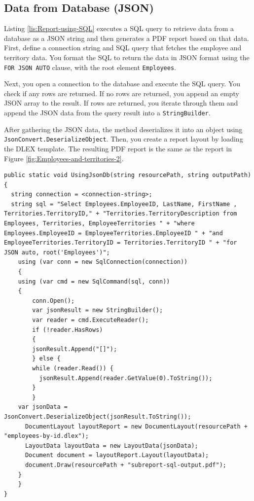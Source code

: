 \documentclass[american,letterpaper]{tufte-book}
\numberwithin{equation}{section}
\numberwithin{figure}{section}
\begin{document}
{{\subsection{Data from Database (JSON)}

Listing \ref{lis:Report-using-SQL} executes a SQL query to retrieve
data from a database as a JSON string and then generates a PDF report
based on that data. First, define a connection string and SQL query
that fetches the employee and territory data. You format the SQL to
return the data in JSON format using the \texttt{FOR JSON AUTO} clause,
with the root element \texttt{Employees}.

Next, you open a connection to the database and execute the SQL query.
You check if any rows are returned. If no rows are returned, you append
an empty JSON array to the result. If rows are returned, you iterate
through them and append the JSON data from the query result into a
\texttt{StringBuilder}.

After gathering the JSON data, the method deserializes it into an
object using \texttt{JsonConvert.DeserializeObject}. Then, you create
a report layout by loading the DLEX template. The resulting PDF report
is the same as the report in Figure \ref{fig:Employees-and-territories-2}.

\bgroup{}
\begin{lstlisting}[caption={Report using SQL and JSON.},label={lis:Report-using-SQL},basicstyle={\small\ttfamily},breaklines=true]
public static void UsingJsonDb(string resourcePath, string outputPath)
{
  string connection = <connection-string>;
  string sql = "Select Employees.EmployeeID, LastName, FirstName , Territories.TerritoryID," + "Territories.TerritoryDescription from Employees, Territories, EmployeeTerritories " + "where Employees.EmployeeID = EmployeeTerritories.EmployeeID " + "and EmployeeTerritories.TerritoryID = Territories.TerritoryID " + "for JSON auto, root('Employees')";
    using (var conn = new SqlConnection(connection))
    {
    using (var cmd = new SqlCommand(sql, conn))
    {
        conn.Open();
        var jsonResult = new StringBuilder();
        var reader = cmd.ExecuteReader();
        if (!reader.HasRows)
        {
        jsonResult.Append("[]");
        } else {
        while (reader.Read()) {
          jsonResult.Append(reader.GetValue(0).ToString());
        }
        }
    var jsonData = JsonConvert.DeserializeObject(jsonResult.ToString());
      DocumentLayout layoutReport = new DocumentLayout(resourcePath + "employees-by-id.dlex");
      LayoutData layoutData = new LayoutData(jsonData);
      Document document = layoutReport.Layout(layoutData);
      document.Draw(resourcePath + "subreport-sql-output.pdf");
    }
    }
}
\end{lstlisting}
\leavevmode\egroup


}}
\end{document}
